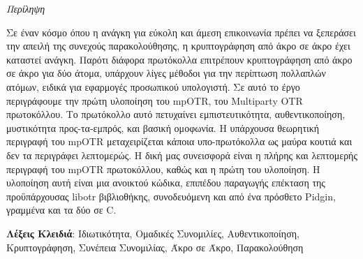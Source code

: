 \documentclass[
11pt, %
english, %
singlespacing, %
parskip, %
headsepline, %
]{MastersDoctoralThesis} %
\begin{document}





\thispagestyle{plain}
\begin{center}
  {\huge\textit{Περίληψη} \par}
  \bigskip
\end{center}

Σε έναν κόσμο όπου η ανάγκη για εύκολη και άμεση επικοινωνία πρέπει να ξεπεράσει την απειλή της συνεχούς παρακολούθησης, η κρυπτογράφηση από άκρο σε άκρο έχει καταστεί ανάγκη.
Παρότι διάφορα πρωτόκολλα επιτρέπουν κρυπτογράφηση από άκρο σε άκρο για δύο άτομα, υπάρχουν λίγες μέθοδοι για την περίπτωση πολλαπλών ατόμων, ειδικά για εφαρμογές προσωπικού υπολογιστή.
Σε αυτό το έργο περιγράφουμε την πρώτη υλοποίηση του mpOTR, του Multiparty OTR πρωτοκόλλου.
Το πρωτόκολλο αυτό πετυχαίνει εμπιστευτικότητα, αυθεντικοποίηση, μυστικότητα προς-τα-εμπρός, και βασική ομοφωνία.
Η υπάρχουσα θεωρητική περιγραφή του mpOTR μεταχειρίζεται κάποια υπο-πρωτόκολλα ως μαύρα κουτιά και δεν τα περιγράφει λεπτομερώς.
Η δική μας συνεισφορά είναι η πλήρης και λεπτομερής περιγραφή του mpOTR πρωτοκόλλου, καθώς και η πρώτη του υλοποίηση.
Η υλοποίηση αυτή είναι μια ανοικτού κώδικα, επιπέδου παραγωγής επέκταση της προϋπάρχουσας libotr βιβλιοθήκης, συνοδευόμενη και από ένα πρόσθετο Pidgin, γραμμένα και τα δύο σε C.

  \vspace*{\fill}

  {\bf Λέξεις Κλειδιά}: Ιδιωτικότητα, Ομαδικές Συνομιλίες, Αυθεντικοποίηση, Κρυπτογράφηση, Συνέπεια Συνομιλίας, Άκρο σε Άκρο, Παρακολούθηση

\cleardoublepage

\end{document}
